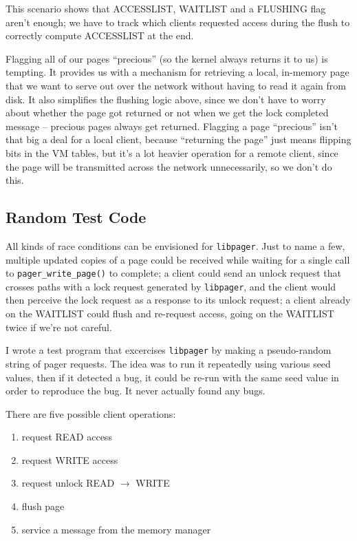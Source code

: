 \documentclass{article}
\def\libpager{{\tt libpager}\xspace}
\def\pagerwritepage{{\tt pager_write_page()}\xspace}
\begin{document}
This scenario shows that ACCESSLIST, WAITLIST and a FLUSHING flag
aren't enough; we have to track which clients requested access during
the flush to correctly compute ACCESSLIST at the end.

Flagging all of our pages ``precious'' (so the kernel always returns
it to us) is tempting.  It provides us with a mechanism for retrieving
a local, in-memory page that we want to serve out over the network
without having to read it again from disk.  It also simplifies the
flushing logic above, since we don't have to worry about whether the
page got returned or not when we get the lock completed message --
precious pages always get returned.  Flagging a page ``precious''
isn't that big a deal for a local client, because ``returning the
page'' just means flipping bits in the VM tables, but it's a lot
heavier operation for a remote client, since the page will be
transmitted across the network unnecessarily, so we don't do this.


\subsection{Random Test Code}

All kinds of race conditions can be envisioned for \libpager.  Just to
name a few, multiple updated copies of a page could be received while
waiting for a single call to \pagerwritepage to complete; a client
could send an unlock request that crosses paths with a lock request
generated by \libpager, and the client would then perceive the lock
request as a response to its unlock request; a client already on the
WAITLIST could flush and re-request access, going on the WAITLIST
twice if we're not careful.

I wrote a test program that excercises \libpager by making a
pseudo-random string of pager requests.  The idea was to run it
repeatedly using various seed values, then if it detected a bug, it
could be re-run with the same seed value in order to reproduce the
bug.  It never actually found any bugs.

There are five possible client operations:

\begin{enumerate}
\item request READ access
\item request WRITE access
\item request unlock READ $\to$ WRITE
\item flush page
\item service a message from the memory manager
\end{enumerate}
\end{document}
